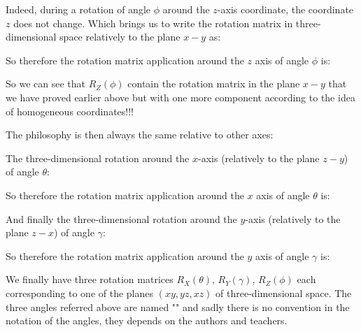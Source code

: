 	Indeed, during a rotation of angle $\phi$ around the $z$-axis coordinate, the coordinate $z$ does not change. Which brings us to write the rotation matrix in three-dimensional space relatively to the plane $x-y$ as:
	
	\begin{center}
	\centering
	\end{center}
	So therefore the rotation matrix application around the $z$ axis of angle $\phi$ is:
		
	 So we can see that $R_Z(\phi)$ contain the rotation matrix in the plane $x-y$ that we have proved earlier above but with one more component according to the idea of homogeneous coordinates!!!
	 
	 The philosophy is then always the same relative to other axes:
	 
	 The three-dimensional rotation around the $x$-axis (relatively to the plane $z-y$) of angle $\theta$:
	
	\begin{center}
	\centering
	\end{center}
	So therefore the rotation matrix application around the $x$ axis of angle $\theta$ is:
	
	 
	 And finally the three-dimensional rotation around the $y$-axis (relatively to the plane $z-x$) of angle $\gamma$:
	
	\begin{center}
	\centering
	\end{center}
	So therefore the rotation matrix application around the $y$ axis of angle $\gamma$ is:
	
	 We finally have three rotation matrices $R_X(\theta)$, $R_Y(\gamma)$, $R_Z(\phi)$ each corresponding to one of the planes $(xy,yz,xz)$ of three-dimensional space. The three angles referred above are named "" and sadly there is no convention in the notation of the angles, they depends on the authors and teachers.

